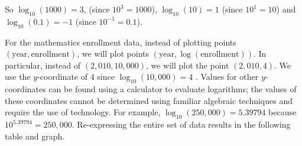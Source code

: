 \documentclass[10pt,]{book}
\theoremstyle{plain}
\theoremstyle{definition}
\theoremstyle{definition}
\theoremstyle{definition}
\numberwithin{equation}{section}
\begin{document}
\par
\hypertarget{p-279}{}%
So \(\log_{10}(1000) = 3\), (since \(10^3 = 1000\)), \(\log_{10}(10) = 1\) (since \(10^1 = 10\))  and \(\log_{10}(0.1) = -1\) (since \(10^{-1} = 0.1\)).%
\par
\hypertarget{p-280}{}%
For the mathematics enrollment data, instead of plotting points \((\text{year}, \text{enrollment})\), we will plot points \((\text{year}, \log ( \text{enrollment} ) )\). In particular, instead of \((2,010, 10,000)\), we will plot the point \((2,010, 4)\). We use the \(y\)-coordinate of \(4\) since \(\log_{10}(10,000) = 4\) . Values for other \(y\)-coordinates can be found using a calculator to evaluate logarithms; the values of these coordinates cannot be determined using familiar algebraic techniques and require the use of technology. For example, \(\log_{10}(250,000) = 5.39794\) because \(10^{5.39794} = 250,000\). Re-expressing the entire set of data results in the following table and graph.%
\end{document}
